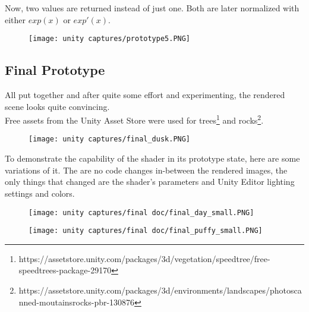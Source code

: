\noindent
Now, two values are returned instead of just one. Both are later normalized with either $exp(x)$ or $exp'(x)$.

\begin{figure}[H]
    \centering
    \texttt{[image: unity captures/prototype5.PNG]}
    \label{img:captures:prototype5}
\end{figure}

\clearpage
\subsection{Final Prototype}
All put together and after quite some effort and experimenting, the rendered scene looks quite convincing. 
\\
Free assets from the Unity Asset Store were used for trees\footnote[1]{https://assetstore.unity.com/packages/3d/vegetation/speedtree/free-speedtrees-package-29170} and rocks\footnote[2]{https://assetstore.unity.com/packages/3d/environments/landscapes/photoscanned-moutainsrocks-pbr-130876}.

\begin{figure}[H]
    \centering
    \texttt{[image: unity captures/final\_dusk.PNG]}
    \label{img:captures:prototype_final:afternoon}
\end{figure}

\clearpage
\noindent
To demonstrate the capability of the shader in its prototype state, here are some variations of it. The are no code changes in-between the rendered images, the only things that changed are the shader's \gls{parameters} and Unity Editor lighting settings and colors.

\begin{figure}[H]
    \centering
        \begin{minipage}{0.47\linewidth}
            \texttt{[image: unity captures/final doc/final\_day\_small.PNG]}
            \label{img:captures:prototype_final:day}
        \end{minipage}
    \hfill
        \begin{minipage}{0.47\linewidth}
            \texttt{[image: unity captures/final doc/final\_puffy\_small.PNG]}
            \label{img:captures:prototype_final:puffy}
        \end{minipage}
\end{figure}

